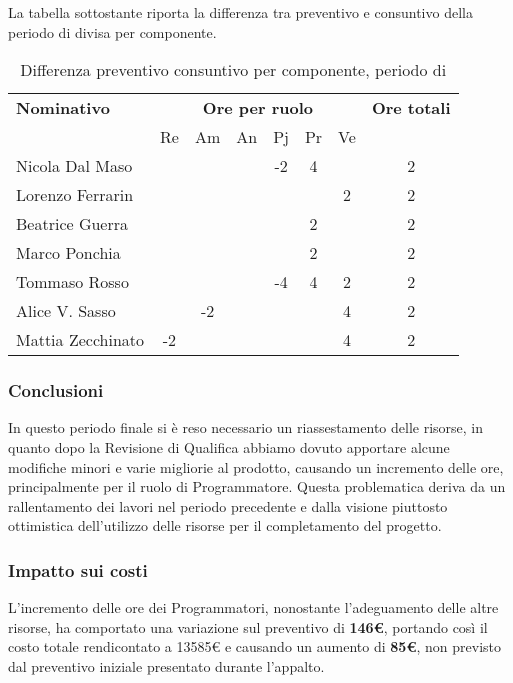 La tabella sottostante riporta la differenza tra preventivo e consuntivo della periodo di \VV{} divisa per componente.
\begin{table}[H]
	\centering
	\begin{tabular}{|l|c|c|c|c|c|c|c|}
		\hline
		\textbf{Nominativo} & 
		\multicolumn{6}{c|}{\textbf{Ore per ruolo}} & 
		\textbf{Ore totali} \\
		& Re & Am & An & Pj & Pr & Ve & \\
		\hline
		Nicola Dal Maso & & & &-2 & 4& & 2 \\
		Lorenzo Ferrarin & & & & & & 2& 2 \\
		Beatrice Guerra & & & & &2 & & 2 \\
		Marco Ponchia & & & & & 2& & 2 \\
		Tommaso Rosso & & & & -4& 4&2 & 2 \\
		Alice V. Sasso & & -2& & & & 4& 2 \\
		Mattia Zecchinato &-2 & & & & &4 & 2 \\
		\hline
	\end{tabular}
	\caption{Differenza preventivo consuntivo per componente, periodo di \VV}
\end{table}

\subsubsection{Conclusioni}
In questo periodo finale si è reso necessario un riassestamento delle risorse, in quanto dopo la Revisione di Qualifica abbiamo dovuto apportare alcune modifiche minori e varie migliorie al prodotto, causando un incremento delle ore, principalmente per il ruolo di Programmatore. Questa problematica deriva da un rallentamento dei lavori nel periodo precedente e dalla visione piuttosto ottimistica dell'utilizzo delle risorse per il completamento del progetto.

\subsubsection{Impatto sui costi}
L'incremento delle ore dei Programmatori, nonostante l'adeguamento delle altre risorse, ha comportato una variazione sul preventivo di \textbf{146€}, portando così il costo totale rendicontato a 13585€ e causando un aumento di \textbf{85€}, non previsto dal preventivo iniziale presentato durante l'appalto.

\clearpage

